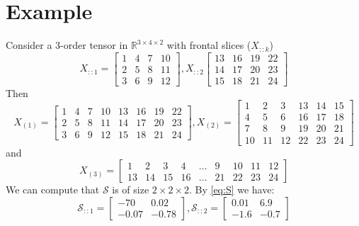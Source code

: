 \documentclass{article}
\def\R{\mathbb{R}}
\begin{document}
\section{Example}
Consider a 3-order tensor in $\R^{3\times 4 \times 2}$ with frontal slices ($X_{::k}$)
$$
X_{::1} = \begin{bmatrix}
1 & 4 & 7 & 10 \\
2 & 5 & 8 & 11 \\
3 & 6 & 9 & 12 
\end{bmatrix},
X_{::2} \begin{bmatrix}
13 & 16 & 19 & 22 \\
14 & 17 & 20 & 23 \\
15 & 18 & 21 & 24 
\end{bmatrix}
$$
Then $$
X_{(1)} = \begin{bmatrix}
1 & 4 & 7 & 10 & 13 & 16 & 19 & 22 \\
2 & 5 & 8 & 11 & 14 & 17 & 20 & 23 \\
3 & 6 & 9 & 12 & 15 & 18 & 21 & 24
\end{bmatrix},
X_{(2)} = \begin{bmatrix}
1 & 2 & 3 & 13 & 14 & 15 \\
4 & 5 & 6& 16 & 17 & 18 \\
7 & 8 & 9 & 19 & 20 & 21\\
10 & 11 & 12 & 22 & 23 & 24
\end{bmatrix}
$$
and 
$$
X_{(3)} = \begin{bmatrix}
1 & 2 & 3 & 4 & \dots & 9 & 10 & 11 & 12 \\
13 & 14 & 15 & 16 & \dots & 21 & 22 & 23 & 24
\end{bmatrix}
$$
We can compute that $\mathcal{S}$ is of size $ 2 \times 2 \times 2 $.
By  \eqref{eq:S} we have:
$$
\mathcal{S}_{::1} = 
\begin{bmatrix}
-70 & 0.02 \\
-0.07 & -0.78
\end{bmatrix},
\mathcal{S}_{::2} = 
\begin{bmatrix}
0.01 &  6.9 \\
-1.6 & -0.7
\end{bmatrix}
$$
\newpage
\end{document}
